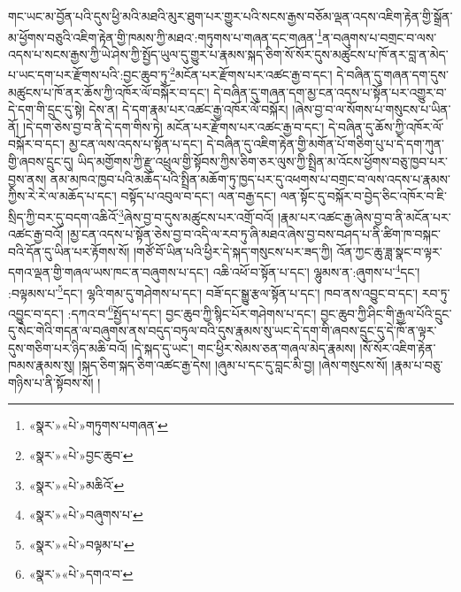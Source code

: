 གང་ཡང་མ་བྱོན་པའི་དུས་ཕྱི་མའི་མཐའི་མུར་ཐུག་པར་གྱུར་པའི་སངས་རྒྱས་བཅོམ་ལྡན་འདས་འཇིག་རྟེན་གྱི་སྒྲོན་མ་ཕྱོགས་བཅུའི་འཇིག་རྟེན་གྱི་ཁམས་ཀྱི་མཐའ་:གཏུགས་པ་གཞན་དང་གཞན་\footnote{«སྣར་»«པེ་»གཏུགས་པགཞན་}ན་བཞུགས་པ་བགྲང་བ་ལས་འདས་པ་སངས་རྒྱས་ཀྱི་ཡེ་ཤེས་ཀྱི་སྤྱོད་ཡུལ་དུ་གྱུར་པ་རྣམས་སྐད་ཅིག་སོ་སོར་དུས་མཚུངས་པ་ཁོ་ནར་བླ་ན་མེད་པ་ཡང་དག་པར་རྫོགས་པའི་:བྱང་ཆུབ་ཏུ་\footnote{«སྣར་»«པེ་»བྱང་ཆུབ་}མངོན་པར་རྫོགས་པར་འཚང་རྒྱ་བ་དང་། དེ་བཞིན་དུ་གཞན་དག་དུས་མཚུངས་པ་ཁོ་ནར་ཆོས་ཀྱི་འཁོར་ལོ་བསྐོར་བ་དང་། དེ་བཞིན་དུ་གཞན་དག་མྱ་ངན་འདས་པ་སྟོན་པར་འགྱུར་བ་དེ་དག་གི་དྲུང་དུ་སྟེ། དེས་ན། དེ་དག་རྣམ་པར་འཚང་རྒྱ་འཁོར་ལོ་བསྐོར། །ཞེས་བྱ་བ་ལ་སོགས་པ་གསུངས་པ་ཡིན་ནོ། །དེ་དག་ཅེས་བྱ་བ་ནི་དེ་དག་གིས་ཏེ། མངོན་པར་རྫོགས་པར་འཚང་རྒྱ་བ་དང་། དེ་བཞིན་དུ་ཆོས་ཀྱི་འཁོར་ལོ་བསྐོར་བ་དང་། མྱ་ངན་ལས་འདས་པ་སྟོན་པ་དང་། དེ་བཞིན་དུ་འཇིག་རྟེན་གྱི་མགོན་པོ་གཅིག་པུ་པ་དེ་དག་ཀུན་གྱི་ཞབས་དྲུང་དུ། ཡིད་མགྱོགས་ཀྱི་རྫུ་འཕྲུལ་གྱི་སྟོབས་ཀྱིས་ཅིག་ཅར་ལུས་ཀྱི་སྤྲིན་མ་འོངས་ཕྱོགས་བཅུ་ཁྱབ་པར་བྱས་ནས། ནམ་མཁའ་ཁྱབ་པའི་མཆོད་པའི་སྤྲིན་མཆོག་ཏུ་ཁྱད་པར་དུ་འཕགས་པ་བགྲང་བ་ལས་འདས་པ་རྣམས་ཀྱིས་རེ་རེ་ལ་མཆོད་པ་དང་། བསྟོད་པ་འབུལ་བ་དང་། ལན་བརྒྱ་དང་། ལན་སྟོང་དུ་བསྐོར་བ་བྱེད་ཅིང་འཁོར་བ་ཇི་སྲིད་ཀྱི་བར་དུ་བདག་འཆིའོ་\footnote{«སྣར་»«པེ་»མཆིའོ་}ཞེས་བྱ་བ་དུས་མཚུངས་པར་འགྲོ་བའོ། །རྣམ་པར་འཚང་རྒྱ་ཞེས་བྱ་བ་ནི་མངོན་པར་འཚང་རྒྱ་བའོ། །མྱ་ངན་འདས་པ་སྟོན་ཅེས་བྱ་བ་འདི་ལ་རབ་ཏུ་ཞི་མཐའ་ཞེས་བྱ་བས་བཤད་པ་ནི་ཚིག་ཁ་བསྐང་བའི་དོན་དུ་ཡིན་པར་རྟོགས་སོ། །གཙོ་བོ་ཡིན་པའི་ཕྱིར་དེ་སྐད་གསུངས་པར་ཟད་ཀྱི། འོན་ཀྱང་ཆུ་ཟླ་སྣང་བ་ལྟར་དགའ་ལྡན་གྱི་གཞལ་ཡས་ཁང་ན་བཞུགས་པ་དང་། འཆི་འཕོ་བ་སྟོན་པ་དང་། ལྷུམས་ན་:ཞུགས་པ་\footnote{«སྣར་»«པེ་»བཞུགས་པ་}དང་། :བལྟམས་པ་\footnote{«སྣར་»«པེ་»བལྟམ་པ་}དང་། ལྷའི་གམ་དུ་གཤེགས་པ་དང་། བཟོ་དང་སྒྱུ་རྩལ་སྟོན་པ་དང་། ཁབ་ནས་འབྱུང་བ་དང་། རབ་ཏུ་འབྱུང་བ་དང་། :དཀའ་བ་\footnote{«སྣར་»«པེ་»དགའ་བ་}སྤྱོད་པ་དང་། བྱང་ཆུབ་ཀྱི་སྙིང་པོར་གཤེགས་པ་དང་། བྱང་ཆུབ་ཀྱི་ཤིང་གི་རྒྱལ་པོའི་དྲུང་དུ་སེང་གེའི་གདན་ལ་བཞུགས་ནས་བདུད་བཏུལ་བའི་དུས་རྣམས་སུ་ཡང་དེ་དག་གི་ཞབས་དྲུང་དུ་དེ་ཁོ་ན་ལྟར་དུས་གཅིག་པར་ཉིད་མཆི་བའོ། །དེ་སྐད་དུ་ཡང་། གང་ཕྱིར་སེམས་ཅན་གཞལ་མེད་རྣམས། །སོ་སོར་འཇིག་རྟེན་ཁམས་རྣམས་སུ། །སྐད་ཅིག་སྐད་ཅིག་འཚང་རྒྱ་དེས། །ཞུམ་པ་དང་དུ་བླང་མི་བྱ། །ཞེས་གསུངས་སོ། །རྣམ་པ་བཅུ་གཉིས་པ་ནི་སྟོབས་སོ། །
